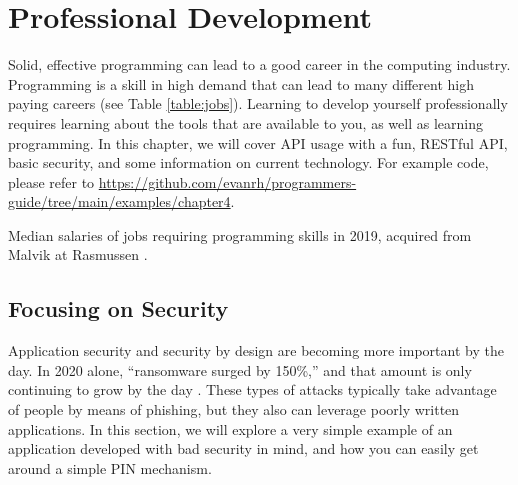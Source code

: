 \documentclass[12pt, oneside, a4paper]{book}
\begin{document}
   \chapter{Professional Development}
   \label{chap:prof_devel}
      Solid, effective programming can lead to a good career in the computing industry.
      Programming is a skill in high demand that can lead to many different high paying careers (see Table \ref*{table:jobs}).
      Learning to develop yourself professionally requires learning about the tools that are available to you, as well as learning programming.
      In this chapter, we will cover API usage with a fun, RESTful API, basic security, and some information on current technology.
      For example code, please refer to \url{https://github.com/evanrh/programmers-guide/tree/main/examples/chapter4}.
      \begin{table}[H]
         \caption{
            Median salaries of jobs requiring programming skills in 2019, acquired from Malvik at Rasmussen \autocite{malvikProgrammingCareersCoding}.
         }
         \label{table:jobs}
      \end{table}

      \section{Focusing on Security}
      Application security and security by design are becoming more important by the day.
      In 2020 alone, ``ransomware surged by 150\%,'' and that amount is only continuing to grow by the day \autocite{muncasterRansomwareAttacksSoared2021}.
      These types of attacks typically take advantage of people by means of phishing, but they also can leverage poorly written applications.
      In this section, we will explore a very simple example of an application developed with bad security in mind, and how you can easily get around a simple PIN mechanism.
\end{document}
